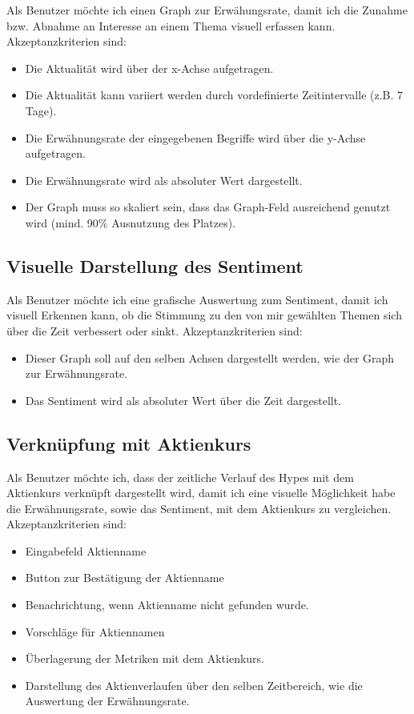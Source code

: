 \documentclass[a4paper, 10pt, conference]{ieeeconf}
\begin{document}
Als Benutzer möchte ich einen Graph zur Erwähungsrate, damit ich die Zunahme bzw. Abnahme an Interesse an einem Thema visuell erfassen kann. Akzeptanzkriterien sind:
\begin{itemize}
\item Die Aktualität wird über der x-Achse aufgetragen.
\item Die Aktualität kann variiert werden durch vordefinierte Zeitintervalle (z.B. 7 Tage).
\item Die Erwähnungsrate der eingegebenen Begriffe wird über die y-Achse aufgetragen.
\item Die Erwähnungsrate wird als absoluter Wert dargestellt.
\item Der Graph muss so skaliert sein, dass das Graph-Feld ausreichend genutzt wird (mind. 90\% Ausnutzung des Platzes).
\end{itemize}

\subsection{Visuelle Darstellung des Sentiment}

Als Benutzer möchte ich eine grafische Auswertung zum Sentiment, damit ich visuell Erkennen kann, ob die Stimmung zu den von mir gewählten Themen sich über die Zeit verbessert oder sinkt. Akzeptanzkriterien sind:
\begin{itemize}
\item Dieser Graph soll auf den selben Achsen dargestellt werden, wie der Graph zur Erwähnungsrate.
\item Das Sentiment wird als absoluter Wert über die Zeit dargestellt.
\end{itemize}

\subsection{Verknüpfung mit Aktienkurs}

Als Benutzer möchte ich, dass der zeitliche Verlauf des Hypes mit dem Aktienkurs verknüpft dargestellt wird, damit ich eine visuelle Möglichkeit habe die Erwähnungsrate, sowie das Sentiment, mit dem Aktienkurs zu vergleichen. Akzeptanzkriterien sind:
\begin{itemize}
\item Eingabefeld Aktienname
\item Button zur Bestätigung der Aktienname
\item Benachrichtung, wenn Aktienname nicht gefunden wurde.
\item Vorschläge für Aktiennamen
\item Überlagerung der Metriken mit dem Aktienkurs.
\item Darstellung des Aktienverlaufen über den selben Zeitbereich, wie die Auswertung der Erwähnungsrate.
\end{itemize}
\end{document}
